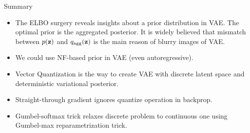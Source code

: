 \begin{frame}{Summary}
	\begin{itemize}
		\item The ELBO surgery reveals insights about a prior distribution in VAE. The optimal prior is the aggregated posterior. It is widely believed that mismatch between $p(\mathbf{z})$ and $q_{\text{agg}}(\mathbf{z})$ is the main reason of blurry images of VAE.
		\vfill
		\item We could use NF-based prior in VAE (even autoregressive).
		\vfill	
		\item Vector Quantization is the way to create VAE with discrete latent space and deterministic variational posterior. 
		\vfill
		\item Straight-through gradient ignores quantize operation in backprop.			
		\vfill
		\item Gumbel-softmax trick relaxes discrete problem to continuous one using Gumbel-max reparametrization trick.
	\end{itemize}
\end{frame}

 

